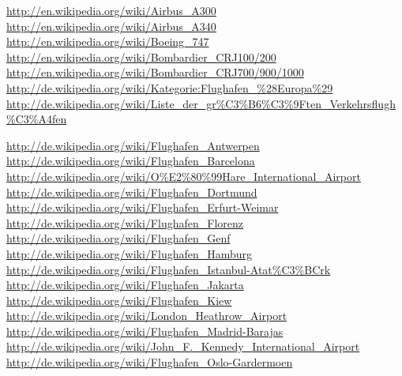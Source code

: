 \url{http://en.wikipedia.org/wiki/Airbus_A300}\\
\url{http://en.wikipedia.org/wiki/Airbus_A340}\\
\url{http://en.wikipedia.org/wiki/Boeing_747}\\
\url{http://en.wikipedia.org/wiki/Bombardier_CRJ100/200}\\
\url{http://en.wikipedia.org/wiki/Bombardier_CRJ700/900/1000}\\

\url{http://de.wikipedia.org/wiki/Kategorie:Flughafen_\%28Europa\%29}\\
\url{http://de.wikipedia.org/wiki/Liste_der_gr\%C3\%B6\%C3\%9Ften_Verkehrsflugh\%C3\%A4fen}

\url{http://de.wikipedia.org/wiki/Flughafen_Antwerpen}\\
\url{http://de.wikipedia.org/wiki/Flughafen_Barcelona}\\
\url{http://de.wikipedia.org/wiki/O\%E2\%80\%99Hare_International_Airport}\\
\url{http://de.wikipedia.org/wiki/Flughafen_Dortmund}\\
\url{http://de.wikipedia.org/wiki/Flughafen_Erfurt-Weimar}\\
\url{http://de.wikipedia.org/wiki/Flughafen_Florenz}\\
\url{http://de.wikipedia.org/wiki/Flughafen_Genf}\\
\url{http://de.wikipedia.org/wiki/Flughafen_Hamburg}\\
\url{http://de.wikipedia.org/wiki/Flughafen_Istanbul-Atat\%C3\%BCrk}\\
\url{http://de.wikipedia.org/wiki/Flughafen_Jakarta}\\
\url{http://de.wikipedia.org/wiki/Flughafen_Kiew}\\
\url{http://de.wikipedia.org/wiki/London_Heathrow_Airport}\\
\url{http://de.wikipedia.org/wiki/Flughafen_Madrid-Barajas}\\
\url{http://de.wikipedia.org/wiki/John_F._Kennedy_International_Airport}\\
\url{http://de.wikipedia.org/wiki/Flughafen_Oslo-Gardermoen}

